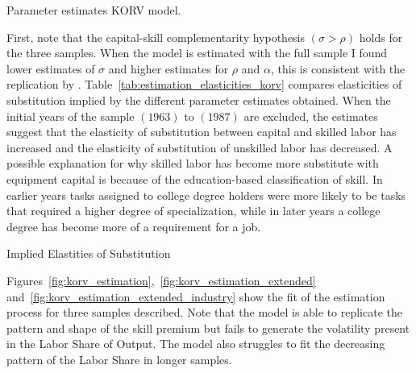 \documentclass[12pt]{article}
\begin{document}
\begin{table}[H]
\begin{center}
 
 \caption{\label{tab:estimation_korv} Parameter estimates KORV model.}
\end{center}
\end{table}

First, note that the capital-skill complementarity hypothesis $(\sigma > \rho)$ holds for the three samples. When the model is estimated with the full sample I found lower estimates of $\sigma$ and higher estimates for $\rho$ and $\alpha$, this is consistent with the replication by \citet{ohanian2021revisiting}. Table~\ref{tab:estimation_elasticities_korv} compares elasticities of substitution implied by the different parameter estimates obtained. When the initial years of the sample $(1963)$ to $(1987)$ are excluded, the estimates suggest that the elasticity of substitution between capital and skilled labor has increased and the elasticity of substitution of unskilled labor has decreased. A possible explanation for why skilled labor has become more substitute with equipment capital is because of the education-based classification of skill. In earlier years tasks assigned to college degree holders were more likely to be tasks that required a higher degree of specialization, while in later years a college degree has become more of a requirement for a job.
\begin{table}[H]
 \begin{center}
 
 \caption{\label{tab:estimation_elasticities_korv} Implied Elastities of Substitution}
 \end{center}
 \end{table}

Figures~\ref{fig:korv_estimation},~\ref{fig:korv_estimation_extended} and~\ref{fig:korv_estimation_extended_industry} show the fit of the estimation process for three samples described. Note that the model is able to replicate the pattern and shape of the skill premium but fails to generate the volatility present in the Labor Share of Output. The model also struggles to fit the decreasing pattern of the Labor Share in longer samples.
\end{document}
